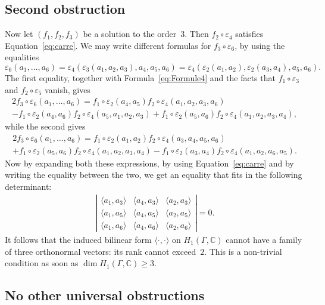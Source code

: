 \documentclass[11pt]{article}
\theoremstyle{definition}
\newcommand{\CC}{\mathbb{C}}
\begin{document}
\subsection{Second obstruction}

Now let $(f_1,f_2,f_3)$ be a solution to the order~$3$. Then
$f_2\circ\varepsilon_4$ satisfies Equation~\eqref{eq:carre}. We may write
different formulas for $f_3\circ\varepsilon_6$, by using the equalities
\[ \varepsilon_6(a_1,\ldots,a_6)=\varepsilon_4(\varepsilon_3(a_1,a_2,a_3),
a_4,a_5,a_6)=\varepsilon_4(\varepsilon_2(a_1,a_2),\varepsilon_2(a_3,a_4),
a_5,a_6). \]
The first equality, together with Formula~\eqref{eq:Formule4} and the facts
that $f_1\circ\varepsilon_3$ and $f_2\circ\varepsilon_5$ vanish, gives
\begin{multline*}
2f_3\circ\varepsilon_6(a_1,\ldots,a_6)=f_1\circ\varepsilon_2(a_4,a_5)
f_2\circ\varepsilon_4(a_1,a_2,a_3,a_6)\\
-f_1\circ\varepsilon_2(a_4,a_6) f_2\circ\varepsilon_4(a_5,a_1,a_2,a_3)+f_1\circ\varepsilon_2(a_5,a_6)f_2\circ\varepsilon_4(a_1,a_2,a_3,a_4),
\end{multline*}
while the second gives
\begin{multline*}
2f_3\circ\varepsilon_6(a_1,\ldots,a_6)=f_1\circ\varepsilon_2(a_1,a_2)
f_2\circ\varepsilon_4(a_3,a_4,a_5,a_6)\\+f_1\circ\varepsilon_2(a_5,a_6)
f_2\circ\varepsilon_4(a_1,a_2,a_3,a_4)-f_1\circ\varepsilon_2(a_3,a_4)f_2\circ\varepsilon_4(a_1,a_2,a_6,a_5).
\end{multline*}
Now by expanding both these expressions, by using Equation~\eqref{eq:carre}
and by writing the equality between the two, we get an equality that fits
in the following determinant:
\begin{align*}
\left|\begin{array}{ccc}
\langle a_1,a_3\rangle & \langle a_4,a_3\rangle & \langle a_2,a_3\rangle \\
\langle a_1,a_5\rangle & \langle a_4,a_5\rangle & \langle a_2,a_5\rangle \\
\langle a_1,a_6\rangle & \langle a_4,a_6\rangle & \langle a_2,a_6\rangle
\end{array}\right|=0.
\end{align*}
It follows that the induced bilinear form $\langle\cdot,\cdot\rangle$ on
$H_1(\Gamma,\CC)$ cannot have a family of three orthonormal vectors: its
rank cannot exceed~$2$. This is a non-trivial condition as soon as
$\dim H_1(\Gamma,\CC)\geq 3$.

\subsection{No other universal obstructions}
\end{document}
